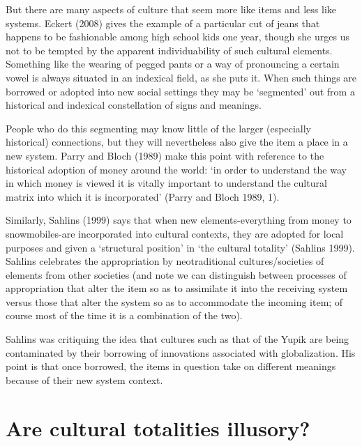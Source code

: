 But there are many aspects of culture that seem more like items and less 
like systems. Eckert (2008) gives the example of a particular cut of 
jeans that happens to be fashionable among high school kids one year, 
though she urges us not to be tempted by the apparent individuability of 
such cultural elements. Something like the wearing of pegged pants or a 
way of pronouncing a certain vowel is always situated in an indexical 
field, as she puts it. When such things are borrowed or adopted into new 
social settings they may be \textquoteleft segmented' out from a historical and 
indexical constellation of signs and meanings. 



People who do this segmenting may know little of the larger (especially 
historical) connections, but they will nevertheless also give the item a 
place in a new system. Parry and Bloch (1989) make this point with 
reference to the historical adoption of money around the world: \textquoteleft in 
order to understand the way in which money is viewed it is vitally 
important to understand the cultural matrix into which it is 
incorporated' (Parry and Bloch 1989, 1).



Similarly, Sahlins (1999) says that when new elements-everything from 
money to snowmobiles-are incorporated into cultural contexts, they are 
adopted for local purposes and given a \textquoteleft structural position' in \textquoteleft the 
cultural totality' (Sahlins 1999). Sahlins celebrates the appropriation 
by neotraditional cultures/societies of elements from other societies 
(and note we can distinguish between processes of appropriation that 
alter the item so as to assimilate it into the receiving system versus 
those that alter the system so as to accommodate the incoming item; of 
course most of the time it is a combination of the two). 



Sahlins was critiquing the idea that cultures such as that of the Yupik 
are being contaminated by their borrowing of innovations associated with 
globalization. His point is that once borrowed, the items in question 
take on different meanings because of their new system context. 



\section{Are cultural totalities illusory?}


